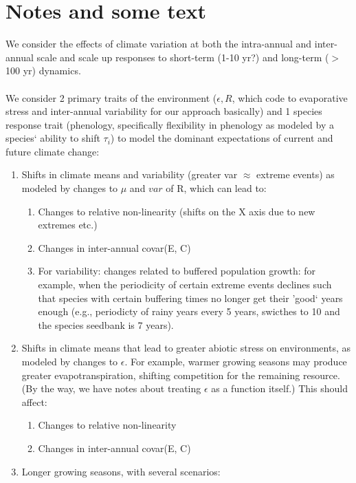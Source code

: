 \documentclass[11pt,a4paper,oneside]{article}
\begin{document}
\section{Notes and some text}
\noindent We consider the effects of climate variation at both the
intra-annual and inter-annual scale and scale up responses to
short-term (1-10 yr?) and long-term (\(>\)100 yr) dynamics. \\
\\
\noindent We
consider 2 primary traits of the environment (\(\epsilon, R\), which
code to evaporative stress and inter-annual variability for our approach basically) and 1
species response trait (phenology, specifically flexibility in
phenology as modeled by a species` ability to shift \(\tau_{i}\)) to model
the dominant expectations of current and future climate change:
\begin{enumerate}
\item Shifts in climate means and variability (greater var \(\approx\)
  extreme events) as modeled by changes to \(\mu\) and \(var\) of R,
  which can lead to:
\begin{enumerate}
\item Changes to relative non-linearity (shifts on the X axis due to
  new extremes etc.)
\item Changes in inter-annual covar(E, C)
\item For variability: changes related to buffered population growth:
  for example, when the periodicity of certain extreme events declines
  such that species with certain buffering times no longer get their
  'good` years enough (e.g., periodicty of rainy years every 5 years,
  swicthes to 10 and the species seedbank is 7 years).
\end{enumerate}
\item Shifts in climate means that lead to greater abiotic stress on
  environments, as modeled by changes to \(\epsilon\). For example,
  warmer growing seasons may produce greater evapotranspiration,
  shifting competition for the remaining resource. (By the way, we
  have notes about treating \(\epsilon\) as a function itself.) This should
  affect:
\begin{enumerate}
\item Changes to relative non-linearity
\item Changes in inter-annual covar(E, C)
\end{enumerate}
\item Longer growing seasons, with several scenarios:
\begin{enumerate}

\end{enumerate}
\end{enumerate}
\end{document}
